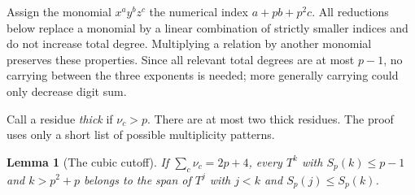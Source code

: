 \documentclass[11pt]{article}
\newtheorem{lemma}[theorem]{Lemma}
\theoremstyle{remark}\newtheorem{remark}[theorem]{Remark}
\begin{document}
Assign the monomial $x^a y^b z^c$ the numerical index $a+pb+p^2c$. All reductions below replace a monomial by a linear combination of strictly smaller indices and do not increase total degree. Multiplying a relation by another monomial preserves these properties. Since all relevant total degrees are at most $p-1$, no carrying between the three exponents is needed; more generally carrying could only decrease digit sum.

Call a residue \emph{thick} if $\nu_c>p$. There are at most two thick residues. The proof uses only a short list of possible multiplicity patterns.

\begin{lemma}[The cubic cutoff]\label{lem:cubic}
If $\sum_c\nu_c=2p+4$, every $T^k$ with $S_p(k)\le p-1$ and $k>p^2+p$ belongs to the span of $T^j$ with $j<k$ and $S_p(j)\le S_p(k)$.
\end{lemma}
\end{document}
